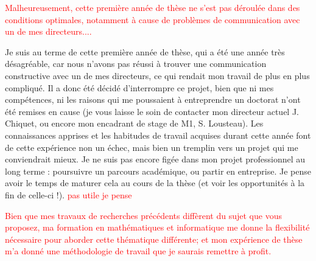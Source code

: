 \documentclass[a4paper,11pt]{article}
\begin{document}
\textcolor{red}{Malheureusement, cette première année de thèse ne s'est pas déroulée dans des conditions optimales, notamment à cause de problèmes de communication avec un de mes directeurs....}

Je suis au terme de cette première année de thèse, qui a été une année très désagréable, car nous n'avons pas réussi à trouver une communication constructive avec un de mes directeurs, ce qui rendait mon travail de plus en plus compliqué. Il a donc été décidé d'interrompre ce projet, bien que ni mes compétences, ni les raisons qui me poussaient à entreprendre un doctorat n'ont été remises en cause (je vous laisse le soin de contacter mon directeur actuel J. Chiquet, ou encore mon encadrant de stage de M1, S. Lousteau).
Les connaissances apprises et les habitudes de travail acquises durant cette année %
font de cette expérience non un échec, mais bien un tremplin vers un projet qui me conviendrait mieux. 
%
Je ne suis pas encore figée dans mon projet professionnel au long terme : poursuivre un parcours académique, ou partir en entreprise. Je pense avoir le temps de maturer cela au cours de la thèse (et voir les opportunités à la fin de celle-ci !).  \textcolor{red}{pas utile je pense}
%
%
%

\textcolor{red}{Bien que mes travaux de recherches précédents diffèrent du sujet que vous proposez, ma formation en mathématiques et informatique me donne la flexibilité nécessaire pour aborder cette thématique différente; et mon expérience de thèse m'a donné une méthodologie de travail que je saurais remettre à profit.}
\end{document}
